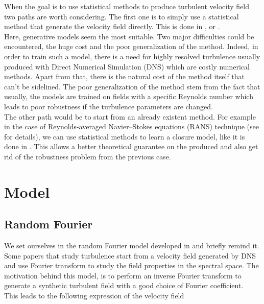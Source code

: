 \documentclass[a4paper,12pt]{article}
\begin{document}
When the goal is to use statistical methods to produce turbulent velocity field two paths are worth considering. The first one is to simply use a statistical method that generate the velocity field directly. This is done in \cite{Yousif_Yu_Lim_2022},\cite{wang2025fourierflowfrequencyawareflowmatching} or \cite{parikh2025conditionalflowmatchinggenerative}. \\
Here, generative models seem the most suitable. Two major difficulties could be encountered, the huge cost and the poor generalization of the method. Indeed, in order to train such a model, there is a need for highly resolved turbulence usually produced with Direct Numerical Simulation (DNS) which are costly numerical methods. Apart from that, there is the natural cost of the method itself that can't be sidelined. The poor generalization of the method stem from the fact that usually, the models are trained on fields with a specific Reynolds number which leads to poor robustness if the turbulence parameters are changed. \\
The other path would be to start from an already existent method. For example in the case of Reynolds-averaged Navier–Stokes equations (RANS) technique (see \cite{} for details), we can use statistical methods to learn a closure model, like it is done in \cite{Bezgin2021}. This allows a better theoretical guarantee on the produced and also get rid of the robustness problem from the previous case.  

\newpage

\section{Model}

\subsection{Random Fourier}

We set ourselves in the random Fourier model developed in \cite{Janin2021} and briefly remind it. 
Some papers that study turbulence start from a velocity field generated by DNS and use Fourier transform to study the field properties in the spectral space. The motivation behind this model, is to perform an inverse Fourier transform to generate a synthetic turbulent field with a good choice of Fourier coefficient. \\
This leads to the following expression of the velocity field 
\end{document}
